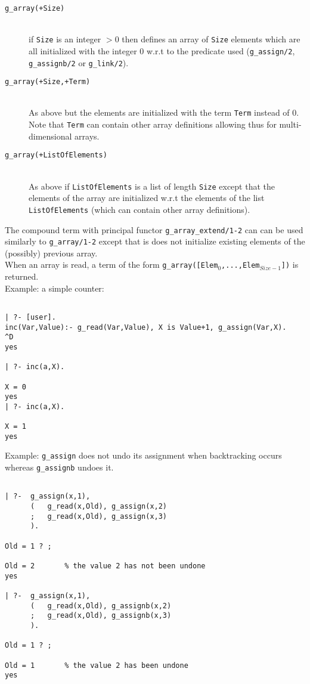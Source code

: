 \begin{description}

\item [{\tt g\_array(+Size)}]~\\
	if {\tt Size} is an integer $>0$ then defines an array of {\tt Size}
	elements which are all initialized with the
	integer 0 w.r.t to the predicate used ({\tt g\_assign/2},
	{\tt g\_assignb/2} or {\tt g\_link/2}).

\item [{\tt g\_array(+Size,+Term)}]~\\
	As above but the elements are initialized with the term
	{\tt Term} instead of 0. Note that {\tt Term} can contain
	other array definitions allowing thus for multi-dimensional
	arrays. 

\item [{\tt g\_array(+ListOfElements)}]~\\
	As above if {\tt ListOfElements} is a list of length {\tt Size}
	except that the elements of the array are initialized
	w.r.t the elements of the list {\tt ListOfElements} (which can
	contain other array definitions).

\end{description}

The compound term with principal functor {\tt g\_array\_extend/1-2} 
can can be used similarly to {\tt g\_array/1-2} except that is does
not initialize existing elements of the (possibly) previous array.\\

When an array is read, a term of the form 
{\tt g\_array([Elem$_0$,...,Elem$_{Size-1}$])} is returned.~\\


Example: a simple counter:

\begin{verbatim}

| ?- [user].
inc(Var,Value):- g_read(Var,Value), X is Value+1, g_assign(Var,X).
^D
yes

| ?- inc(a,X).

X = 0
yes
| ?- inc(a,X).

X = 1
yes

\end{verbatim}



Example: {\tt g\_assign} does not undo its assignment when backtracking
occurs whereas {\tt g\_assignb} undoes it.


\begin{verbatim}

| ?-  g_assign(x,1), 
      (   g_read(x,Old), g_assign(x,2) 
      ;   g_read(x,Old), g_assign(x,3)
      ).

Old = 1 ? ;

Old = 2       % the value 2 has not been undone
yes

| ?-  g_assign(x,1), 
      (   g_read(x,Old), g_assignb(x,2) 
      ;   g_read(x,Old), g_assignb(x,3)
      ).

Old = 1 ? ;

Old = 1       % the value 2 has been undone
yes

\end{verbatim}


